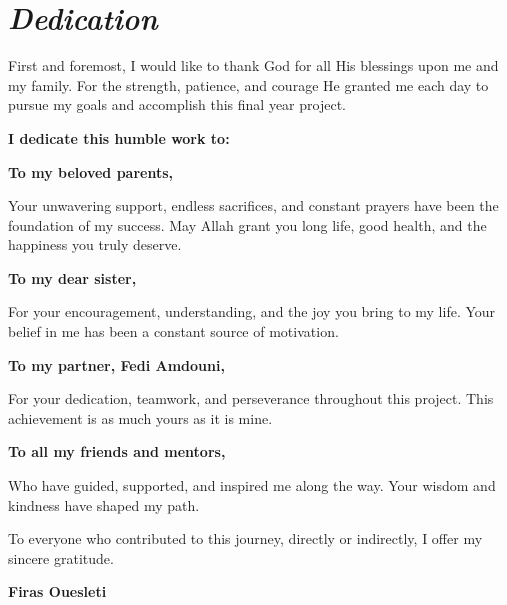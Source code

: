\chapter*{\textit{Dedication}}

\vspace{0.8cm}

\hspace*{\parindent} First and foremost, I would like to thank God for all His blessings upon me and my
family. For the strength, patience, and courage He granted me each day to pursue my
goals and accomplish this final year project.

\vspace{0.5cm}

\noindent\textbf{I dedicate this humble work to:}

\vspace{0.4cm}

\noindent\textbf{To my beloved parents,}

\vspace{0.2cm}
Your unwavering support, endless sacrifices, and constant prayers have been the foundation of my success. May Allah grant you long life, good health, and the happiness you truly deserve.

\vspace{0.4cm}

\noindent\textbf{To my dear sister,}

\vspace{0.2cm}
For your encouragement, understanding, and the joy you bring to my life. Your belief in me has been a constant source of motivation.

\vspace{0.4cm}

\noindent\textbf{To my partner, Fedi Amdouni,}

\vspace{0.2cm}
For your dedication, teamwork, and perseverance throughout this project. This achievement is as much yours as it is mine.

\vspace{0.4cm}

\noindent\textbf{To all my friends and mentors,}

\vspace{0.2cm}
Who have guided, supported, and inspired me along the way. Your wisdom and kindness have shaped my path.

\vspace{0.6cm}

 To everyone who contributed to this journey, directly or indirectly, I offer my sincere gratitude.

\vspace{1.5cm}
\hfill\textbf{Firas Ouesleti}